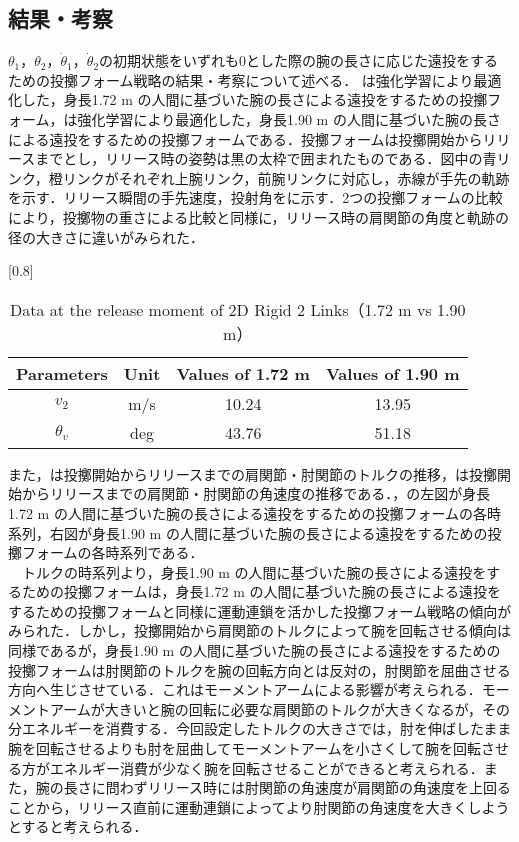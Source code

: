\begin{small}
\subsection{結果・考察}
$\theta_{1}$，$\theta_{2}$，$\dot{\theta}_{1}$，$\dot{\theta}_{2}$の初期状態をいずれも0とした際の腕の長さに応じた遠投をするための投擲フォーム戦略の結果・考察について述べる．
は強化学習により最適化した，身長1.72 m の人間に基づいた腕の長さによる遠投をするための投擲フォーム，は強化学習により最適化した，身長1.90 m の人間に基づいた腕の長さによる遠投をするための投擲フォームである．投擲フォームは投擲開始からリリースまでとし，リリース時の姿勢は黒の太枠で囲まれたものである．図中の青リンク，橙リンクがそれぞれ上腕リンク，前腕リンクに対応し，赤線が手先の軌跡を示す．リリース瞬間の手先速度，投射角をに示す．2つの投擲フォームの比較により，投擲物の重さによる比較と同様に，リリース時の肩関節の角度と軌跡の径の大きさに違いがみられた．
\begin{table}[tb]
  \begin{center}
    \caption{Data at the release moment of 2D Rigid 2 Links（1.72 m vs 1.90 m）}
    \scalebox{0.8}[0.8]{
    \begin{tabular}{c|c|c|c}
      \hline
      Parameters & Unit & Values of 1.72 m & Values of 1.90 m \\
      \hline
      $v_{2}$ & m/s & 10.24 & 13.95 \\
      $\theta_{v}$ & deg & 43.76 & 51.18 \\
      \hline
    \end{tabular}
    }
  \end{center}
\end{table}
また，は投擲開始からリリースまでの肩関節・肘関節のトルクの推移，は投擲開始からリリースまでの肩関節・肘関節の角速度の推移である．，の左図が身長1.72 m の人間に基づいた腕の長さによる遠投をするための投擲フォームの各時系列，右図が身長1.90 m の人間に基づいた腕の長さによる遠投をするための投擲フォームの各時系列である．\\
　トルクの時系列より，身長1.90 m の人間に基づいた腕の長さによる遠投をするための投擲フォームは，身長1.72 m の人間に基づいた腕の長さによる遠投をするための投擲フォームと同様に運動連鎖を活かした投擲フォーム戦略の傾向がみられた．しかし，投擲開始から肩関節のトルクによって腕を回転させる傾向は同様であるが，身長1.90 m の人間に基づいた腕の長さによる遠投をするための投擲フォームは肘関節のトルクを腕の回転方向とは反対の，肘関節を屈曲させる方向へ生じさせている．これはモーメントアームによる影響が考えられる．モーメントアームが大きいと腕の回転に必要な肩関節のトルクが大きくなるが，その分エネルギーを消費する．今回設定したトルクの大きさでは，肘を伸ばしたまま腕を回転させるよりも肘を屈曲してモーメントアームを小さくして腕を回転させる方がエネルギー消費が少なく腕を回転させることができると考えられる．また，腕の長さに問わずリリース時には肘関節の角速度が肩関節の角速度を上回ることから，リリース直前に運動連鎖によってより肘関節の角速度を大きくしようとすると考えられる．

\end{small}
